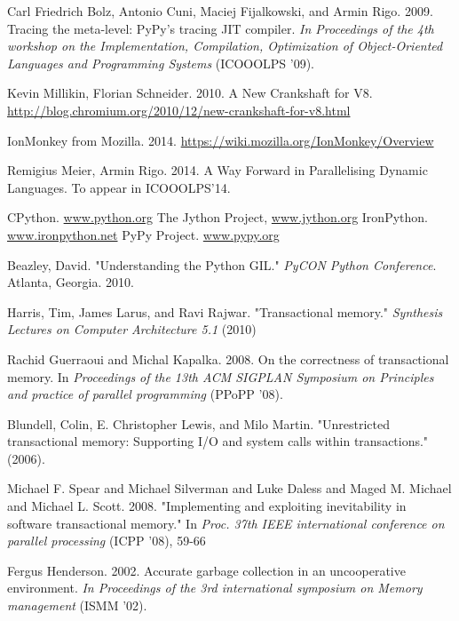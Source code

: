\documentclass{sigplanconf}
\begin{document}
\begin{thebibliography}{}
\softraggedright

 Carl Friedrich Bolz, Antonio Cuni, Maciej
  Fijalkowski, and Armin Rigo. 2009. Tracing the meta-level: PyPy's
  tracing JIT compiler.  \emph{In Proceedings of the 4th workshop on the
    Implementation, Compilation, Optimization of Object-Oriented Languages
    and Programming Systems} (ICOOOLPS '09).

 Kevin Millikin, Florian Schneider. 2010.  A New
  Crankshaft for V8.
  \url{http://blog.chromium.org/2010/12/new-crankshaft-for-v8.html}

 IonMonkey from Mozilla. 2014.
  \url{https://wiki.mozilla.org/IonMonkey/Overview}

 Remigius Meier, Armin Rigo. 2014. A Way Forward
  in Parallelising Dynamic Languages. To appear in ICOOOLPS'14.

 CPython. \url{www.python.org}
 The Jython Project, \url{www.jython.org}
 IronPython. \url{www.ironpython.net}
 PyPy Project. \url{www.pypy.org}

 Beazley, David. "Understanding the Python GIL."
  \emph{PyCON Python Conference}. Atlanta, Georgia. 2010.

 Harris, Tim, James Larus, and Ravi
  Rajwar. "Transactional memory." \emph{Synthesis Lectures on Computer
  Architecture 5.1} (2010)

  Rachid Guerraoui and Michal Kapalka. 2008. On the correctness of
  transactional memory. In \emph{Proceedings of the 13th ACM SIGPLAN
    Symposium on Principles and practice of parallel programming} (PPoPP
  '08).

 Blundell, Colin, E. Christopher Lewis, and Milo
  Martin. "Unrestricted transactional memory: Supporting I/O and system
  calls within transactions." (2006).

 Michael F. Spear and Michael Silverman and Luke
  Daless and Maged M. Michael and Michael L. Scott. 2008. "Implementing
  and exploiting inevitability in software transactional memory."  In
  \emph{Proc. 37th IEEE international conference on parallel
    processing} (ICPP '08), 59-66

 Fergus Henderson. 2002. Accurate garbage collection
  in an uncooperative environment. \emph{In Proceedings of the 3rd
    international symposium on Memory management} (ISMM '02).


\end{thebibliography}
\end{document}
